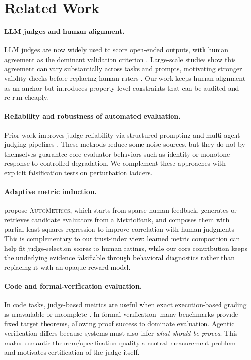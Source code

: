 \section{Related Work}

\paragraph{LLM judges and human alignment.}
LLM judges are now widely used to score open-ended outputs, with human agreement as the dominant validation criterion \citep{Liu2023GEval,Zheng2023MTBench,Kocmi2024HumanVsLLM}.
Large-scale studies show this agreement can vary substantially across tasks and prompts, motivating stronger validity checks before replacing human raters \citep{Kocmi2024HumanVsLLM,Li2024TrustLLMJudgments}.
Our work keeps human alignment as an anchor but introduces property-level constraints that can be audited and re-run cheaply.

\paragraph{Reliability and robustness of automated evaluation.}
Prior work improves judge reliability via structured prompting and multi-agent judging pipelines \citep{Liu2023GEval,Chan2024ChatEval}.
These methods reduce some noise sources, but they do not by themselves guarantee core evaluator behaviors such as identity or monotone response to controlled degradation.
We complement these approaches with explicit falsification tests on perturbation ladders.

\paragraph{Adaptive metric induction.}
\citet{ryan2025autometrics} propose \textsc{AutoMetrics}, which starts from sparse human feedback, generates or retrieves candidate evaluators from a MetricBank, and composes them with partial least-squares regression to improve correlation with human judgments.
This is complementary to our trust-index view: learned metric composition can help fit judge-selection scores to human ratings, while our core contribution keeps the underlying evidence falsifiable through behavioral diagnostics rather than replacing it with an opaque reward model.

\paragraph{Code and formal-verification evaluation.}
In code tasks, judge-based metrics are useful when exact execution-based grading is unavailable or incomplete \citep{TongZhang2024CodeJudge,Zhuo2024ICEScore}.
In formal verification, many benchmarks provide fixed target theorems, allowing proof success to dominate evaluation.
Agentic verification differs because systems must also infer \emph{what should be proved}.
This makes semantic theorem/specification quality a central measurement problem and motivates certification of the judge itself.


